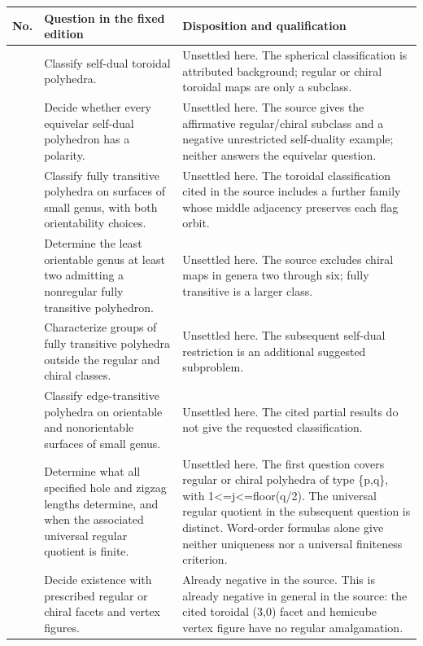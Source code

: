 \small
\begin{longtable}{@{}>{\raggedright\arraybackslash}p{}>{\raggedright\arraybackslash}p{}>{\raggedright\arraybackslash}p{}@{}}
\toprule No. & Question in the fixed edition & Disposition and qualification\\\midrule\endhead
1 & Classify self-dual toroidal polyhedra. & Unsettled here. The spherical classification is attributed background; regular or chiral toroidal maps are only a subclass.\\[5pt]
2 & Decide whether every equivelar self-dual polyhedron has a polarity. & Unsettled here. The source gives the affirmative regular/chiral subclass and a negative unrestricted self-duality example; neither answers the equivelar question.\\[5pt]
3 & Classify fully transitive polyhedra on surfaces of small genus, with both orientability choices. & Unsettled here. The toroidal classification cited in the source includes a further family whose middle adjacency preserves each flag orbit.\\[5pt]
4 & Determine the least orientable genus at least two admitting a nonregular fully transitive polyhedron. & Unsettled here. The source excludes chiral maps in genera two through six; fully transitive is a larger class.\\[5pt]
5 & Characterize groups of fully transitive polyhedra outside the regular and chiral classes. & Unsettled here. The subsequent self-dual restriction is an additional suggested subproblem.\\[5pt]
6 & Classify edge-transitive polyhedra on orientable and nonorientable surfaces of small genus. & Unsettled here. The cited partial results do not give the requested classification.\\[5pt]
7 & Determine what all specified hole and zigzag lengths determine, and when the associated universal regular quotient is finite. & Unsettled here. The first question covers regular or chiral polyhedra of type \{p,q\}, with 1<=j<=floor(q/2). The universal regular quotient in the subsequent question is distinct. Word-order formulas alone give neither uniqueness nor a universal finiteness criterion.\\[5pt]
8 & Decide existence with prescribed regular or chiral facets and vertex figures. & Already negative in the source. This is already negative in general in the source: the cited toroidal (3,0) facet and hemicube vertex figure have no regular amalgamation.\\[5pt]

\end{longtable}
